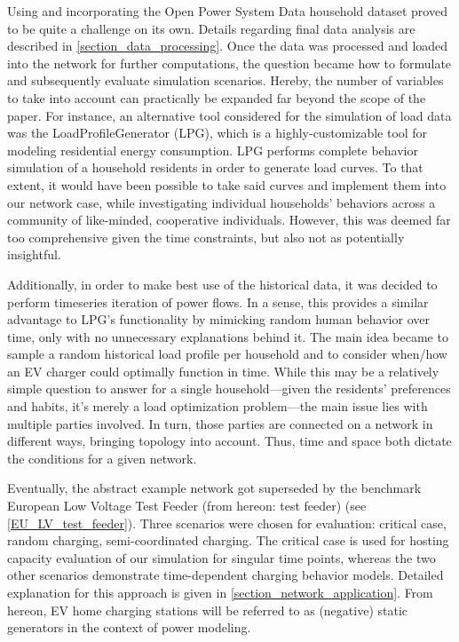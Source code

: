 \documentclass[a4paper,10pt]{report}
\begin{document}
Using and incorporating the Open Power System Data household dataset proved to be quite a challenge on its own. Details regarding final data analysis are described in \cref{section_data_processing}. Once the data was processed and loaded into the network for further computations, the question became how to formulate and subsequently evaluate simulation scenarios. Hereby, the number of variables to take into account can practically be expanded far beyond the scope of the paper. For instance, an alternative tool considered for the simulation of load data was the LoadProfileGenerator (LPG), which is a highly-customizable tool for modeling residential energy consumption. LPG performs complete behavior simulation of a household residents in order to generate load curves. To that extent, it would have been possible to take said curves and implement them into our network case, while investigating individual households' behaviors across a community of like-minded, cooperative individuals. However, this was deemed far too comprehensive given the time constraints, but also not as potentially insightful.

Additionally, in order to make best use of the historical data, it was decided to perform timeseries iteration of power flows. In a sense, this provides a similar advantage to LPG's functionality by mimicking random human behavior over time, only with no unnecessary explanations behind it. The main idea became to sample a random historical load profile per household and to consider when/how an EV charger could optimally function in time. While this may be a relatively simple question to answer for a single household---given the residents' preferences and habits, it's merely a load optimization problem---the main issue lies with multiple parties involved. In turn, those parties are connected on a network in different ways, bringing topology into account. Thus, time and space both dictate the conditions for a given network.

Eventually, the abstract example network got superseded by the benchmark European Low Voltage Test Feeder (from hereon: test feeder) (see \cref{EU_LV_test_feeder}). Three scenarios were chosen for evaluation: critical case, random charging, semi-coordinated charging. The critical case is used for hosting capacity evaluation of our simulation for singular time points, whereas the two other scenarios demonstrate time-dependent charging behavior models. Detailed explanation for this approach is given in \cref{section_network_application}. From hereon, EV home charging stations will be referred to as (negative) static generators in the context of power modeling. %
\end{document}
